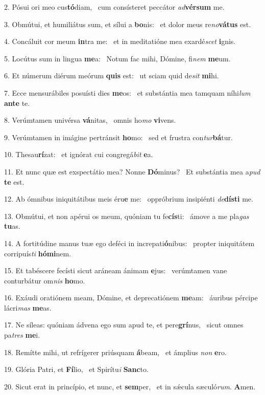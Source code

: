 2. Pósui ori meo cus\textbf{tó}diam, \ast\  cum consísteret peccátor \textit{ad}\textbf{vér}\textbf{sum} me.\

3. Obmútui, et humiliátus sum, et sílui a \textbf{bo}nis: \ast\  et dolor meus re\textit{no}\textbf{vá}\textbf{tus} est.\

4. Concáluit cor meum \textbf{in}tra me: \ast\  et in meditatióne mea exardé\textit{scet} \textbf{i}gnis.\

5. Locútus sum in lingua \textbf{me}a: \ast\  Notum fac mihi, Dómine, fi\textit{nem} \textbf{me}um.\

6. Et númerum diérum meórum \textbf{quis} est: \ast\  ut sciam quid de\textit{sit} \textbf{mi}hi.\

7. Ecce mensurábiles posuísti dies \textbf{me}os: \ast\  et substántia mea tamquam níhi\textit{lum} \textbf{an}\textbf{te} te.\

8. Verúmtamen univérsa \textbf{vá}nitas, \ast\  omnis ho\textit{mo} \textbf{vi}vens.\

9. Verúmtamen in imágine pertránsit \textbf{ho}mo: \ast\  sed et frustra con\textit{tur}\textbf{bá}tur.\

10. Thesau\textbf{rí}zat: \ast\  et ignórat cui congregá\textit{bit} \textbf{e}a.\

11. Et nunc quæ est exspectátio mea? Nonne \textbf{Dó}minus? \ast\  Et substántia mea a\textit{pud} \textbf{te} est.\

12. Ab ómnibus iniquitátibus meis éru\textbf{e} me: \ast\  oppróbrium insipiénti \textit{de}\textbf{dís}\textbf{ti} me.\

13. Obmútui, et non apérui os meum, quóniam tu fe\textbf{cís}ti: \ast\  ámove a me pla\textit{gas} \textbf{tu}as.\

14. A fortitúdine manus tuæ ego deféci in increpati\textbf{ó}nibus: \ast\  propter iniquitátem corripuís\textit{ti} \textbf{hó}\textbf{mi}nem.\

15. Et tabéscere fecísti sicut aráneam ánimam \textbf{e}jus: \ast\  verúmtamen vane conturbátur om\textit{nis} \textbf{ho}mo.\

16. Exáudi oratiónem meam, Dómine, et deprecatiónem \textbf{me}am: \ast\  áuribus pércipe lácri\textit{mas} \textbf{me}as.\

17. Ne síleas: quóniam ádvena ego sum apud te, et pere\textbf{grí}nus, \ast\  sicut omnes pa\textit{tres} \textbf{me}i.\

18. Remítte mihi, ut refrígerer priúsquam \textbf{á}beam, \ast\  et ámplius \textit{non} \textbf{e}ro.\

19. Glória Patri, et \textbf{Fí}lio, \ast\  et Spirítu\textit{i} \textbf{Sanc}to.\

20. Sicut erat in princípio, et nunc, et \textbf{sem}per, \ast\  et in sǽcula sæculó\textit{rum}. \textbf{A}men.\

